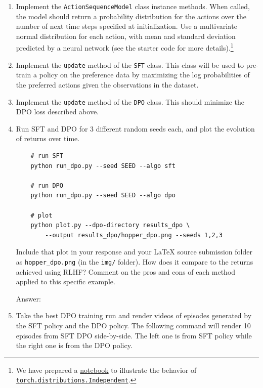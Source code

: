 \documentclass{article}
\newcommand{\answer}[1]{
    \begin{tcolorbox}[breakable]
    Answer: #1
    \end{tcolorbox}
    \clearpage
}
\begin{document}
\begin{enumerate}
    \item[(a)] Implement the \texttt{ActionSequenceModel} class instance methods. When called, the model should return a probability distribution for the actions over the number of next time steps specified at initialization. Use a multivariate normal distribution for each action, with mean and standard deviation predicted by a neural network (see the starter code for more details).\footnote{We have prepared a \href{https://colab.research.google.com/drive/1sw8FJIR5865laTJiI0fqHG3KcGVT23ED}{notebook} to illustrate the behavior of \href{https://pytorch.org/docs/stable/distributions.html\#independent}{\texttt{torch.distributions.Independent}}.}
    \item[(b)] Implement the \texttt{update} method of the \texttt{SFT} class. This class will be used to pre-train a policy on the preference data by maximizing the log probabilities of the preferred actions given the observations in the dataset.
    \item[(c)] Implement the \texttt{update} method of the \texttt{DPO} class. This should minimize the DPO loss described above.
    \item[(d)] Run SFT and DPO for 3 different random seeds each, and plot the evolution of returns over time.
    {\small
    \begin{tcolorbox}
    \begin{verbatim}
    # run SFT 
    python run_dpo.py --seed SEED --algo sft

    # run DPO
    python run_dpo.py --seed SEED --algo dpo

    # plot
    python plot.py --dpo-directory results_dpo \
        --output results_dpo/hopper_dpo.png --seeds 1,2,3
    \end{verbatim}
    \end{tcolorbox}
    }
Include that plot in your response and your LaTeX source submission folder as \texttt{hopper\_dpo.png} (in the \texttt{img/} folder). How does it compare to the returns achieved using RLHF? Comment on the pros and cons of each method applied to this specific example.
\answer{

}

\item[(e)] Take the best DPO training run and render videos of episodes generated by the SFT policy and the DPO policy. The following command will render 10 episodes from SFT DPO side-by-side. The left one is from SFT policy while the right one is from the DPO policy.


\end{enumerate}
\end{document}
